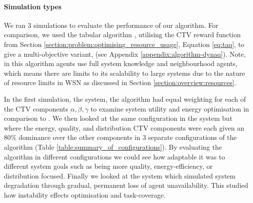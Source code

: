 \paragraph{Simulation types}
We ran $3$ simulations to evaluate the performance of our algorithm. For comparison, we used the tabular \acronymDynaQ{}{} algorithm \citep{Sutton2018}, utilising the CTV reward function from Section \ref{section:problem:optimising_resource_usage}, Equation \ref{eq:taq}, to give a multi-objective variant, \algorithmBaseline{}{} (see Appendix \ref{appendix:algorithm-dynaq}). Note, in this algorithm agents use full system knowledge and neighbourhood agents, which means there are limits to its scalability to large systems due to the nature of resource limits in WSN as discussed in Section \ref{section:overview:resources}. 

In the first simulation, the \simulationSimple{}{} system,  the \acronymWSNOptimisation{}{} algorithm had
equal weighting for each of the CTV components $\alpha, \beta, \gamma$ to examine system utility and energy optimisation in comparison to \acronymDynaQ{}{}.  We then looked at the same configuration in the \simulationExtended{}{} system but where the energy, quality, and distribution CTV components were each given an $80\%$ dominance over the other components in $3$ separate configurations of the algorithm (Table \ref{table:summary_of_configurations}). By evaluating the algorithm in different configurations we could see how adaptable it was to different system goals such as being more quality, energy-efficiency, or distribution focused. Finally we looked at the \simulationNodeFailure{}{} system which simulated system degradation through gradual, permanent loss of agent unavailability. This studied how instability effects optimisation and task-coverage.  

